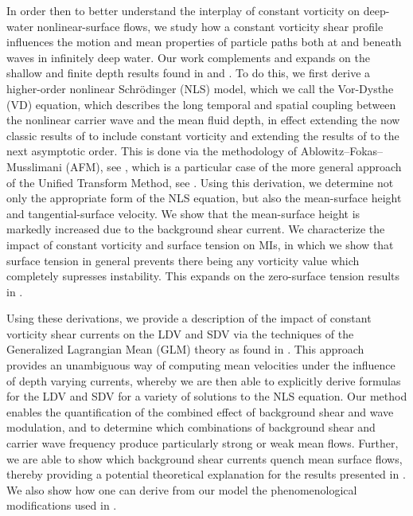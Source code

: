 \documentclass{JFM_Style/jfm}
\begin{document}
In order then to better understand the interplay of constant vorticity on deep-water nonlinear-surface flows, we study how a constant vorticity shear profile influences the motion and mean properties of particle paths both at and beneath waves in infinitely deep water.  Our work complements and expands on the shallow and finite depth results found in \cite{wahlen2,constantin,borluk} and \cite{nachbin}.  To do this, we first derive a higher-order nonlinear Schr\"{o}dinger (NLS) model, which we call the Vor-Dysthe (VD) equation, which describes the long temporal and spatial coupling between the nonlinear carrier wave and the mean fluid depth, in effect extending the now classic results of \cite{dysthe} to include constant vorticity and extending the results of \cite{thomas2012nonlinear} to the next asymptotic order.  This is done via the methodology of Ablowitz--Fokas--Musslimani (AFM), see \cite{afm,ashton}, which is a particular case of the more general approach of the Unified Transform Method, see \cite{fokas2008}.  Using this derivation, we determine not only the appropriate form of the NLS equation, but also the mean-surface height and tangential-surface velocity. We show that the mean-surface height is markedly increased due to the background shear current.  We characterize the impact of constant vorticity and surface tension on MIs, in which we show that surface tension in general prevents there being any vorticity value which completely supresses instability.  This expands on the zero-surface tension results in \cite{thomas2012nonlinear}.  %

Using these derivations, we provide a description of the impact of constant vorticity shear currents on the LDV and SDV via the techniques of the Generalized Lagrangian Mean (GLM) theory as found in \cite{andrews,buhler}. This approach provides an unambiguous way of computing mean velocities under the influence of depth varying currents, whereby we are then able to explicitly derive formulas for the LDV and SDV for a variety of solutions to the NLS equation. Our method enables the quantification of the combined effect of background shear and wave modulation, and to determine which combinations of background shear and carrier wave frequency produce particularly strong or weak mean flows.  Further, we are able to show which background shear currents quench mean surface flows, thereby providing a potential theoretical explanation for the results presented in \cite{smith}. We also show how one can derive from our model the phenomenological modifications used in \cite{breivik}.
\end{document}
